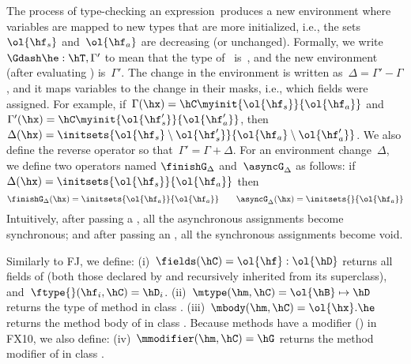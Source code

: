 The process of type-checking an expression~\he produces a new environment
    where variables are mapped to new types that are more initialized,
    i.e., the sets~$\ol{\hf_s}$ and~$\ol{\hf_a}$ are decreasing (or unchanged).
Formally, we write~$\Gdash \he : \hT, \Gamma'$ to mean that the type of~\he
    is~\hT, and the new environment (after evaluating \he) is~$\Gamma'$.
The change in the environment is written as~$\Delta = \Gamma' - \Gamma$,
    and it maps variables to the change in their masks,
    i.e., which fields were assigned.
For example, if~$\Gamma(\hx)=\hC\myinit{\ol{\hf_s}}{\ol{\hf_a}}$
    and~$\Gamma'(\hx)=\hC\myinit{\ol{\hf'_s}}{\ol{\hf'_a}}$,
    then~$\Delta(\hx)=\initsets{\ol{\hf_s} \setminus \ol{\hf'_s}}{\ol{\hf_a} \setminus \ol{\hf'_a}}$.
We also define the reverse operator so that~$\Gamma' = \Gamma + \Delta$.
For an environment change~$\Delta$, we define two operators named
    $\finishG_\Delta$ and~$\asyncG_\Delta$ as follows:
    if~$\Delta(\hx)=\initsets{\ol{\hf_s}}{\ol{\hf_a}}$ then
\[
    \finishG_\Delta(\hx) = \initsets{\ol{\hf_a}}{\ol{\hf_a}} \qquad
    \asyncG_\Delta(\hx) = \initsets{}{\ol{\hf_a}}
\]
Intuitively, after passing a \finish, all the asynchronous assignments become synchronous;
    and after passing an \async, all the synchronous assignments become void.

Similarly to FJ, we define:
(i)~$\fields(\hC)=\ol{\hf}:\ol{\hD}$ returns all fields of \hC (both those declared by \hC and recursively inherited from its superclass),
    and~$\ftype{}(\hf_i,\hC) =\hD_i$.
(ii)~$\mtype(\hm,\hC) = \ol{\hB}\mapsto\hD$ returns the type of method \hm in class \hC.
(iii)~$\mbody(\hm,\hC) = \ol{\hx}.\he$ returns the method body of \hm in class \hC.
Because methods have a modifier (\hG) in FX10, we also define:
(iv)~$\mmodifier(\hm,\hC) = \hG$ returns the method modifier of \hm in class \hC.



